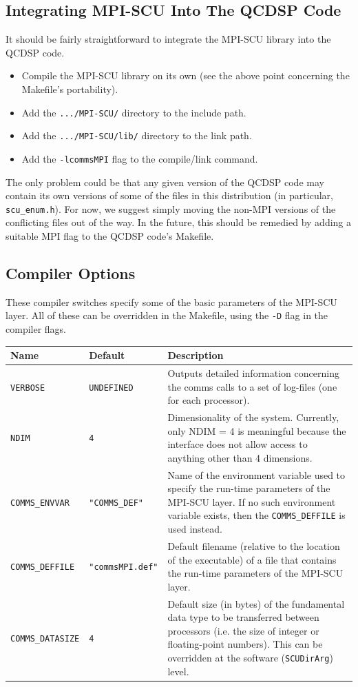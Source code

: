 \documentclass[12pt]{article}
\newcommand{\cde}[1]{{\tt #1}}            %
\begin{document}
\subsection{Integrating MPI-SCU Into The QCDSP Code}
It should be fairly straightforward to integrate the MPI-SCU library into
the QCDSP code.
\begin{itemize}
\item Compile the MPI-SCU library on its own (see the above point concerning the
Makefile's portability).
\item Add the \cde{.../MPI-SCU/} directory to the include path.
\item Add the \cde{.../MPI-SCU/lib/} directory to the link path.  
\item Add the \cde{-lcommsMPI} flag to the compile/link command.
\end{itemize}
The only problem could be that any given version of the QCDSP code may
contain its own versions of some of the files in this distribution (in
particular, \cde{scu\_enum.h}).  For now, we suggest simply moving the
non-MPI versions of the conflicting files out of the way. In the
future, this should be remedied by adding a suitable MPI flag to the
QCDSP code's Makefile.

\subsection{Compiler Options}
These compiler switches specify some of the basic parameters of the
MPI-SCU layer.  All of these can be overridden in the Makefile, using
the \cde{-D} flag in the compiler flags.

\begin{tabularx}{16cm}{l|l|X}
{\bf Name} & {\bf Default} & {\bf Description}\\
\hline
\cde{VERBOSE} & \cde{UNDEFINED} & Outputs detailed information
concerning the comms calls to a set of log-files (one for each
processor).\\
\hline
\cde{NDIM} & \cde{4} & Dimensionality of the system.  Currently, only NDIM = 4 is
meaningful because the interface does not allow access to anything
other than 4 dimensions. \\
\hline
\cde{COMMS\_ENVVAR} & \cde{"COMMS\_DEF"} & Name of the environment variable used
to specify the run-time parameters of the MPI-SCU layer.  If no such
environment variable exists, then the \cde{COMMS\_DEFFILE} is
used instead.\\
\hline
\cde{COMMS\_DEFFILE} & \cde{"commsMPI.def"} & Default filename
(relative to the location of the executable) of a file that contains
the run-time parameters of the MPI-SCU layer.  \\
\hline
\cde{COMMS\_DATASIZE} & \cde{4} & Default size (in bytes) of
the fundamental data type to be transferred between processors
(i.e. the size of integer or floating-point numbers). This can be
overridden at the software (\cde{SCUDirArg}) level.\\
\end{tabularx}
\end{document}
